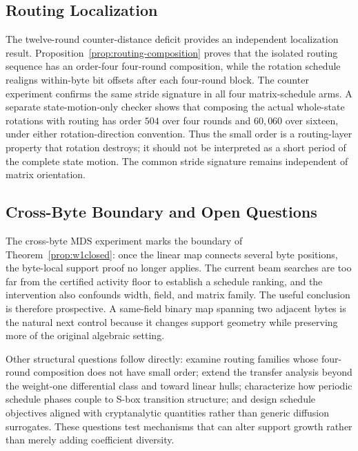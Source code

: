 \documentclass[cryptography,article,submit,oneauthor]{Definitions/mdpi}
\begin{document}
\subsection{Routing Localization}\label{sec:6-routing}
The twelve-round counter-distance deficit provides an independent localization result. Proposition~\ref{prop:routing-composition} proves that the isolated routing sequence has an order-four four-round composition, while the rotation schedule realigns within-byte bit offsets after each four-round block. The counter experiment confirms the same stride signature in all four matrix-schedule arms. A separate state-motion-only checker shows that composing the actual whole-state rotations with routing has order $504$ over four rounds and $60{,}060$ over sixteen, under either rotation-direction convention. Thus the small order is a routing-layer property that rotation destroys; it should not be interpreted as a short period of the complete state motion. The common stride signature remains independent of matrix orientation.

\subsection{Cross-Byte Boundary and Open Questions}\label{sec:6-2}
The cross-byte MDS experiment marks the boundary of Theorem~\ref{prop:w1closed}: once the linear map connects several byte positions, the byte-local support proof no longer applies. The current beam searches are too far from the certified activity floor to establish a schedule ranking, and the intervention also confounds width, field, and matrix family. The useful conclusion is therefore prospective. A same-field binary map spanning two adjacent bytes is the natural next control because it changes support geometry while preserving more of the original algebraic setting.

Other structural questions follow directly: examine routing families whose four-round composition does not have small order; extend the transfer analysis beyond the weight-one differential class and toward linear hulls; characterize how periodic schedule phases couple to S-box transition structure; and design schedule objectives aligned with cryptanalytic quantities rather than generic diffusion surrogates. These questions test mechanisms that can alter support growth rather than merely adding coefficient diversity.
\end{document}
